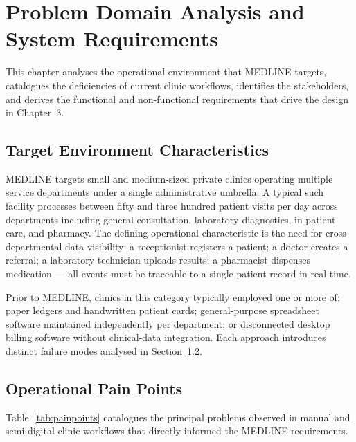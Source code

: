 \documentclass[12pt,a4paper,oneside]{report}
\begin{document}
\chapter{Problem Domain Analysis and System Requirements}

This chapter analyses the operational environment that MEDLINE targets,
catalogues the deficiencies of current clinic workflows, identifies the
stakeholders, and derives the functional and non-functional requirements that
drive the design in Chapter~3.

\section{Target Environment Characteristics}

MEDLINE targets small and medium-sized private clinics operating multiple
service departments under a single administrative umbrella. A typical such
facility processes between fifty and three hundred patient visits per day
across departments including general consultation, laboratory diagnostics,
in-patient care, and pharmacy. The defining operational characteristic is the
need for cross-departmental data visibility: a receptionist registers a
patient; a doctor creates a referral; a laboratory technician uploads results;
a pharmacist dispenses medication --- all events must be traceable to a single
patient record in real time.

Prior to MEDLINE, clinics in this category typically employed one or more of:
paper ledgers and handwritten patient cards; general-purpose spreadsheet
software maintained independently per department; or disconnected desktop
billing software without clinical-data integration. Each approach introduces
distinct failure modes analysed in Section~\ref{sec:painpoints}.

\section{Operational Pain Points}
\label{sec:painpoints}

Table~\ref{tab:painpoints} catalogues the principal problems observed in manual
and semi-digital clinic workflows that directly informed the MEDLINE
requirements.
\end{document}
